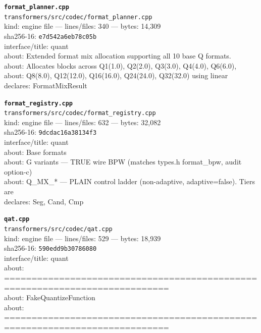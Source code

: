 \noindent\textbf{\texttt{format\_planner.cpp}}\\
\texttt{transformers/src/codec/format\_planner.cpp}\\
kind: engine file --- lines/files: 340 --- bytes: 14,309\\
sha256-16: \texttt{e7d542a6eb78c05b}\\
interface/title: quant\\
about: Extended format mix allocation supporting all 10 base Q formats.\\
about: Allocates blocks across Q1(1.0), Q2(2.0), Q3(3.0), Q4(4.0), Q6(6.0),\\
about: Q8(8.0), Q12(12.0), Q16(16.0), Q24(24.0), Q32(32.0) using linear\\
declares: FormatMixResult\\
\vspace*{6.0pt}

\noindent\textbf{\texttt{format\_registry.cpp}}\\
\texttt{transformers/src/codec/format\_registry.cpp}\\
kind: engine file --- lines/files: 632 --- bytes: 32,082\\
sha256-16: \texttt{9dcdac16a38134f3}\\
interface/title: quant\\
about: Base formats\\
about: G variants — TRUE wire BPW (matches types.h format\_bpw, audit option-c)\\
about: Q\_MX\_* — PLAIN control ladder (non-adaptive, adaptive=false). Tiers are\\
declares: Seg, Cand, Cmp\\
\vspace*{6.0pt}
\newpage

\noindent\textbf{\texttt{qat.cpp}}\\
\texttt{transformers/src/codec/qat.cpp}\\
kind: engine file --- lines/files: 529 --- bytes: 18,939\\
sha256-16: \texttt{590edd9b30786080}\\
interface/title: quant\\
about: ============================================================================\\
about: FakeQuantizeFunction\\
about: ============================================================================\\
\vspace*{6.0pt}

